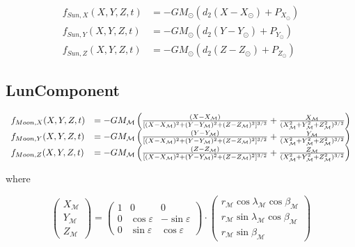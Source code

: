 \documentclass{article}
\begin{document}
\begin{equation}
\begin{array}{ll}
f_{Sun,X}(X,Y,Z,t) &=-GM_\odot(d_2(X-X_{\odot})+P_{X_{\odot}}) \\
f_{Sun,Y}(X,Y,Z,t) &=-GM_\odot(d_2(Y-Y_{\odot})+P_{Y_{\odot}}) \\
f_{Sun,Z}(X,Y,Z,t) &=-GM_\odot(d_2(Z-Z_{\odot})+P_{Z_{\odot}})
\end{array}
\end{equation}

\subsection{LunComponent}

\begin{equation}
\begin{array}{ll}
f_{Moon,X}(X,Y,Z,t) &=-G M_{\mathcal M}\left({(X-X_{\mathcal M})\over [(X-X_{\mathcal M})^2+(Y-Y_{\mathcal M})^2+(Z-Z_{\mathcal M})^2]^{3/2}}
+{X_{\mathcal M}\over(X_{\mathcal M}^2+Y_{\mathcal M}^2+Z_{\mathcal M}^2)^{3/2}} \right)\\
f_{Moon,Y}(X,Y,Z,t) &=-G M_{\mathcal M}\left({(Y-Y_{\mathcal M})\over [(X-X_{\mathcal M})^2+(Y-Y_{\mathcal M})^2+(Z-Z_{\mathcal M})^2]^{3/2}}
+{Y_{\mathcal M}\over(X_{\mathcal M}^2+Y_{\mathcal M}^2+Z_{\mathcal M}^2)^{3/2}} \right)\\
f_{Moon,Z}(X,Y,Z,t) &=-G M_{\mathcal M}\left({(Z-Z_{\mathcal M})\over [(X-X_{\mathcal M})^2+(Y-Y_{\mathcal M})^2+(Z-Z_{\mathcal M})^2]^{3/2}}
+{Z_{\mathcal M}\over(X_{\mathcal M}^2+Y_{\mathcal M}^2+Z_{\mathcal M}^2)^{3/2}} \right)
\end{array}
\end{equation}

where

\begin{equation}
\begin{pmatrix}
X_{\mathcal M}\\
Y_{\mathcal M}\\
Z_{\mathcal M}
\end{pmatrix} = \begin{pmatrix}
1 & 0 & 0 \\
0 & \cos\varepsilon & -\sin\varepsilon\\
0 & \sin\varepsilon & \cos\varepsilon
\end{pmatrix} \cdot \begin{pmatrix}
r_{{\mathcal M}} \cos \lambda_{{\mathcal M}} \cos \beta_{{\mathcal M}}\\
r_{{\mathcal M}} \sin \lambda_{{\mathcal M}} \cos \beta_{{\mathcal M}}\\
r_{{\mathcal M}} \sin \beta_{{\mathcal M}}
\end{pmatrix}
\end{equation}
\end{document}
